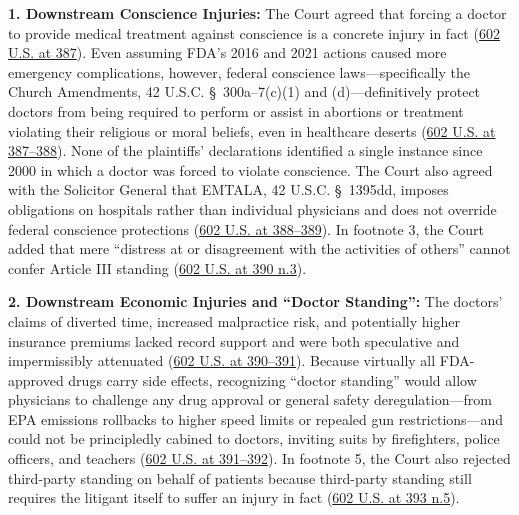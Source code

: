 \documentclass[12pt]{article}
\begin{document}
\textbf{1. Downstream Conscience Injuries:} The Court agreed that forcing a doctor to provide medical treatment against conscience is a concrete injury in fact (\href{https://www.supremecourt.gov/opinions/23pdf/602us1r35_bqmd.pdf}{602 U.S. at 387}). Even assuming FDA's 2016 and 2021 actions caused more emergency complications, however, federal conscience laws---specifically the Church Amendments, 42 U.S.C. \S~300a--7(c)(1) and (d)---definitively protect doctors from being required to perform or assist in abortions or treatment violating their religious or moral beliefs, even in healthcare deserts (\href{https://www.supremecourt.gov/opinions/23pdf/602us1r35_bqmd.pdf}{602 U.S. at 387--388}). None of the plaintiffs' declarations identified a single instance since 2000 in which a doctor was forced to violate conscience. The Court also agreed with the Solicitor General that EMTALA, 42 U.S.C. \S~1395dd, imposes obligations on hospitals rather than individual physicians and does not override federal conscience protections (\href{https://www.supremecourt.gov/opinions/23pdf/602us1r35_bqmd.pdf}{602 U.S. at 388--389}). In footnote 3, the Court added that mere ``distress at or disagreement with the activities of others'' cannot confer Article III standing (\href{https://www.supremecourt.gov/opinions/23pdf/602us1r35_bqmd.pdf}{602 U.S. at 390 n.3}).

\textbf{2. Downstream Economic Injuries and ``Doctor Standing'':} The doctors' claims of diverted time, increased malpractice risk, and potentially higher insurance premiums lacked record support and were both speculative and impermissibly attenuated (\href{https://www.supremecourt.gov/opinions/23pdf/602us1r35_bqmd.pdf}{602 U.S. at 390--391}). Because virtually all FDA-approved drugs carry side effects, recognizing ``doctor standing'' would allow physicians to challenge any drug approval or general safety deregulation---from EPA emissions rollbacks to higher speed limits or repealed gun restrictions---and could not be principledly cabined to doctors, inviting suits by firefighters, police officers, and teachers (\href{https://www.supremecourt.gov/opinions/23pdf/602us1r35_bqmd.pdf}{602 U.S. at 391--392}). In footnote 5, the Court also rejected third-party standing on behalf of patients because third-party standing still requires the litigant itself to suffer an injury in fact (\href{https://www.supremecourt.gov/opinions/23pdf/602us1r35_bqmd.pdf}{602 U.S. at 393 n.5}).
\end{document}

